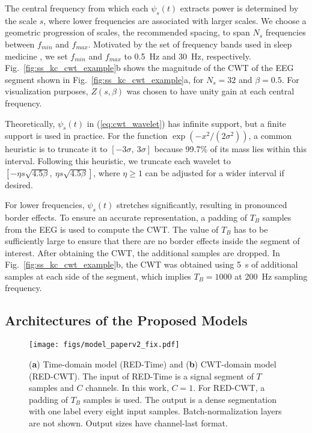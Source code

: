 \documentclass[conference]{IEEEtran}
\begin{document}
The central frequency from which each $\psi_s(t)$ extracts power is determined by the scale $s$, where lower frequencies are associated with larger scales. We choose a geometric progression of scales, the recommended spacing, to span $N_s$ frequencies between $f_{min}$ and $f_{max}$. Motivated by the set of frequency bands used in sleep medicine \cite{berry2012aasm}, we set $f_{min}$ and $f_{max}$ to 0.5~Hz and 30~Hz, respectively. Fig.~\ref{fig:ss_kc_cwt_example}b shows the magnitude of the CWT of the EEG segment shown in Fig.~\ref{fig:ss_kc_cwt_example}a, for $N_s=32$ and $\beta=0.5$. For visualization purposes, $Z(s,\beta)$ was chosen to have unity gain at each central frequency.

Theoretically, $\psi_s(t)$ in (\ref{eq:cwt_wavelet}) has infinite support, but a finite support is used in practice. For the function $\exp(-x^2/(2\sigma^2))$, a common heuristic is to truncate it to $[-3\sigma,\ 3\sigma]$ because 99.7\% of its mass lies within this interval. Following this heuristic, we truncate each wavelet to $[-\eta s \sqrt{4.5\beta},\ \eta s \sqrt{4.5\beta}]$, where $\eta\ge 1$ can be adjusted for a wider interval if desired.

For lower frequencies, $\psi_s(t)$ stretches significantly, resulting in pronounced border effects. To ensure an accurate representation, a padding of $T_B$ samples from the EEG is used to compute the CWT. The value of $T_B$ has to be sufficiently large to ensure that there are no border effects inside the segment of interest. After obtaining the CWT, the additional samples are dropped. In Fig.~\ref{fig:ss_kc_cwt_example}b, the CWT was obtained using 5~s of additional samples at each side of the segment, which implies $T_B=1000$ at 200~Hz sampling frequency.


\subsection{Architectures of the Proposed Models}
\label{sec:models}

\begin{figure}[tbp]
\centering \texttt{[image: figs/model\_paperv2\_fix.pdf]}
\caption{(\textbf{a}) Time-domain model (RED-Time) and (\textbf{b}) CWT-domain model (RED-CWT). The input of RED-Time is a signal segment of $T$ samples and $C$ channels. In this work, $C=1$. For RED-CWT, a padding of $T_B$ samples is used. The output is a dense segmentation with one label every eight input samples. Batch-normalization layers are not shown. Output sizes have channel-last format.}
\label{fig:model}
\end{figure}
\end{document}
